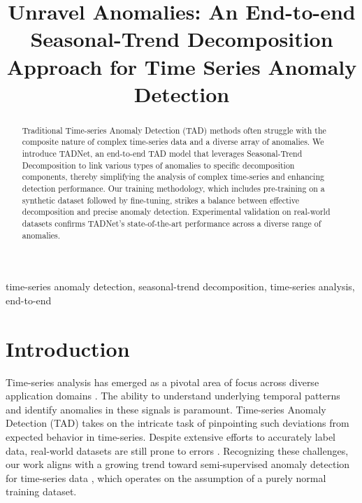 \documentclass{article}
\title{Unravel Anomalies: An End-to-end Seasonal-Trend Decomposition Approach for Time Series Anomaly Detection}
\begin{document}
\topmargin=0mm

\ninept
\maketitle

\begin{abstract}
Traditional Time-series Anomaly Detection (TAD) methods often struggle with the composite nature of complex time-series data and a diverse array of anomalies. We introduce TADNet, an end-to-end TAD model that leverages Seasonal-Trend Decomposition to link various types of anomalies to specific decomposition components, thereby simplifying the analysis of complex time-series and enhancing detection performance. Our training methodology, which includes pre-training on a synthetic dataset followed by fine-tuning, strikes a balance between effective decomposition and precise anomaly detection. Experimental validation on real-world datasets confirms TADNet's state-of-the-art performance across a diverse range of anomalies. 
\end{abstract}

\begin{keywords}  
time-series anomaly detection, seasonal-trend decomposition, time-series analysis, end-to-end
\end{keywords}

\section{Introduction}
\label{sec:intro}
Time-series analysis has emerged as a pivotal area of focus across diverse application domains \cite{gu2020request, 10043819, 10.1145/3583780.3615159}. The ability to understand underlying temporal patterns and identify anomalies in these signals is paramount. Time-series Anomaly Detection (TAD) takes on the intricate task of pinpointing such deviations from expected behavior in time-series. Despite extensive efforts to accurately label data, real-world datasets are still prone to errors \cite{lai2021revisiting, SHANG2023110046}. Recognizing these challenges, our work aligns with a growing trend toward semi-supervised anomaly detection for time-series data \cite{xu2021anomaly, pang2021deep}, which operates on the assumption of a purely normal training dataset.
\end{document}
